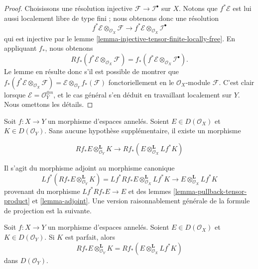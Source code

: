 \begin{proof}
Choisissons une résolution injective $\mathcal{F} \to \mathcal{I}^\bullet$ sur $X$. Notons que $f^*\mathcal{E}$ est lui aussi localement libre de type fini ; nous obtenons donc une résolution $$
f^*\mathcal{E} \otimes_{\mathcal{O}_X} \mathcal{F}
\longrightarrow
f^*\mathcal{E} \otimes_{\mathcal{O}_X} \mathcal{I}^\bullet
$$ qui est injective par le lemme \ref{lemma-injective-tensor-finite-locally-free}. En appliquant $f_*$, nous obtenons $$
Rf_*(f^*\mathcal{E} \otimes_{\mathcal{O}_X} \mathcal{F})
=
f_*(f^*\mathcal{E} \otimes_{\mathcal{O}_X} \mathcal{I}^\bullet).
$$ Le lemme en résulte donc s'il est possible de montrer que $f_*(f^*\mathcal{E} \otimes_{\mathcal{O}_X} \mathcal{F}) =
\mathcal{E} \otimes_{\mathcal{O}_Y} f_*(\mathcal{F})$ fonctoriellement en le $\mathcal{O}_X$-module $\mathcal{F}$. C'est clair lorsque $\mathcal{E} = \mathcal{O}_Y^{\oplus n}$, et le cas général s'en déduit en travaillant localement sur $Y$. Nous omettons les détails.
\end{proof}
\noindent

Soit $f : X \to Y$ un morphisme d'espaces annelés. Soient $E \in D(\mathcal{O}_X)$ et $K \in D(\mathcal{O}_Y)$. Sans aucune hypothèse supplémentaire, il existe un morphisme

\begin{equation}
\label{equation-projection-formula-map}
Rf_*E \otimes^\mathbf{L}_{\mathcal{O}_Y} K
\longrightarrow
Rf_*(E \otimes^\mathbf{L}_{\mathcal{O}_X} Lf^*K)
\end{equation}

Il s'agit du morphisme adjoint au morphisme canonique
$$
Lf^*(Rf_*E \otimes^\mathbf{L}_{\mathcal{O}_Y} K) =
Lf^*Rf_*E \otimes^\mathbf{L}_{\mathcal{O}_X} Lf^*K
\longrightarrow
E \otimes^\mathbf{L}_{\mathcal{O}_X} Lf^*K
$$
provenant du morphisme $Lf^*Rf_*E \to E$ et des lemmes
\ref{lemma-pullback-tensor-product} et \ref{lemma-adjoint}. Une version raisonnablement générale de la formule de projection est la suivante.

\begin{lemma}

\label{lemma-projection-formula-perfect}
Soit $f : X \to Y$ un morphisme d'espaces annelés. Soient $E \in D(\mathcal{O}_X)$ et $K \in D(\mathcal{O}_Y)$. Si $K$ est parfait, alors $$
Rf_*E \otimes^\mathbf{L}_{\mathcal{O}_Y} K =
Rf_*(E \otimes^\mathbf{L}_{\mathcal{O}_X} Lf^*K)
$$ dans $D(\mathcal{O}_Y)$.
\end{lemma}

